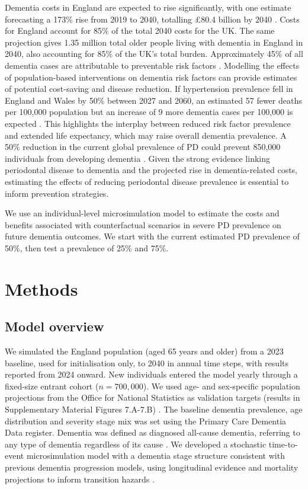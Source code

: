 \documentclass[11pt,a4paper]{article}
\begin{document}
Dementia costs in England are expected to rise significantly, with one estimate forecasting a 173\% rise from 2019 to 2040, totalling \pounds80.4 billion by 2040 \cite{ref17}. Costs for England account for 85\% of the total 2040 costs for the UK. The same projection gives 1.35 million total older people living with dementia in England in 2040, also accounting for 85\% of the UK's total burden. Approximately 45\% of all dementia cases are attributable to preventable risk factors \cite{ref18}. Modelling the effects of population-based interventions on dementia risk factors can provide estimates of potential cost-saving and disease reduction. If hypertension prevalence fell in England and Wales by 50\% between 2027 and 2060, an estimated 57 fewer deaths per 100,000 population but an increase of 9 more dementia cases per 100,000 is expected \cite{ref19}. This highlights the interplay between reduced risk factor prevalence and extended life expectancy, which may raise overall dementia prevalence. A 50\% reduction in the current global prevalence of PD could prevent 850,000 individuals from developing dementia \cite{ref6}. Given the strong evidence linking periodontal disease to dementia and the projected rise in dementia-related costs, estimating the effects of reducing periodontal disease prevalence is essential to inform prevention strategies.

We use an individual-level microsimulation model to estimate the costs and benefits associated with counterfactual scenarios in severe PD prevalence on future dementia outcomes. We start with the current estimated PD prevalence of 50\%, then test a prevalence of 25\% and 75\%.

\section{Methods}

\subsection{Model overview}

We simulated the England population (aged 65 years and older) from a 2023 baseline, used for initialisation only, to 2040 in annual time steps, with results reported from 2024 onward. New individuals entered the model yearly through a fixed-size entrant cohort ($n = 700{,}000$). We used age- and sex-specific population projections from the Office for National Statistics as validation targets (results in Supplementary Material Figures 7.A-7.B) \cite{ref20,ref21}. The baseline dementia prevalence, age distribution and severity stage mix was set using the Primary Care Dementia Data register. Dementia was defined as diagnosed all-cause dementia, referring to any type of dementia regardless of its cause \cite{ref22}. We developed a stochastic time-to-event microsimulation model with a dementia stage structure consistent with previous dementia progression models, using longitudinal evidence and mortality projections to inform transition hazards \cite{ref19,ref23,ref24,ref25}.
\end{document}
